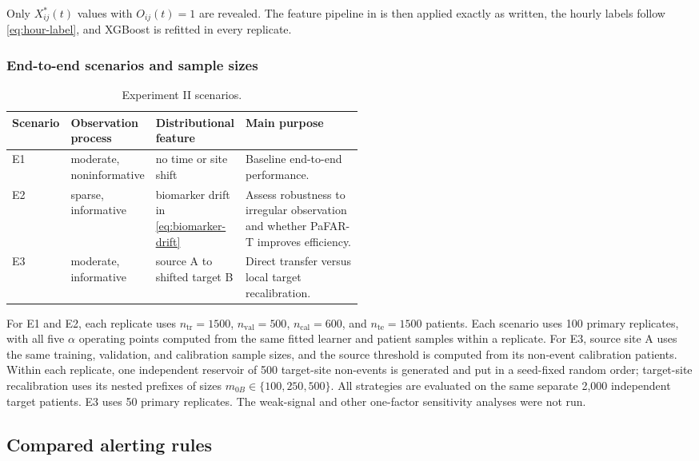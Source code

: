\documentclass[11pt]{article}
\begin{document}
Only $X_{ij}^{\ast}(t)$ values with $O_{ij}(t)=1$ are revealed. The feature pipeline in  is then applied exactly as written, the hourly labels follow \eqref{eq:hour-label}, and XGBoost is refitted in every replicate.

\subsubsection{End-to-end scenarios and sample sizes}

\begin{table}[!htbp]
\centering
\caption{Experiment II scenarios.}
\label{tab:ehr-scenarios}
\begin{tabularx}{\linewidth}{@{}L{0.10\linewidth}L{0.19\linewidth}L{0.22\linewidth}Y@{}}
\toprule
Scenario & Observation process & Distributional feature & Main purpose \\
\midrule
E1 & moderate, noninformative & no time or site shift & Baseline end-to-end performance. \\
E2 & sparse, informative & biomarker drift in \eqref{eq:biomarker-drift} & Assess robustness to irregular observation and whether PaFAR-T improves efficiency. \\
E3 & moderate, informative & source A to shifted target B & Direct transfer versus local target recalibration. \\
\bottomrule
\end{tabularx}
\end{table}

For E1 and E2, each replicate uses $n_{\mathrm{tr}}=1500$, $n_{\mathrm{val}}=500$, $n_{\mathrm{cal}}=600$, and $n_{\mathrm{te}}=1500$ patients. Each scenario uses 100 primary replicates, with all five $\alpha$ operating points computed from the same fitted learner and patient samples within a replicate. For E3, source site A uses the same training, validation, and calibration sample sizes, and the source threshold is computed from its non-event calibration patients. Within each replicate, one independent reservoir of 500 target-site non-events is generated and put in a seed-fixed random order; target-site recalibration uses its nested prefixes of sizes $m_{0B}\in\{100,250,500\}$. All strategies are evaluated on the same separate 2,000 independent target patients. E3 uses 50 primary replicates. The weak-signal and other one-factor sensitivity analyses were not run.

\subsection{Compared alerting rules}\label{subsec:comparators}
\end{document}
